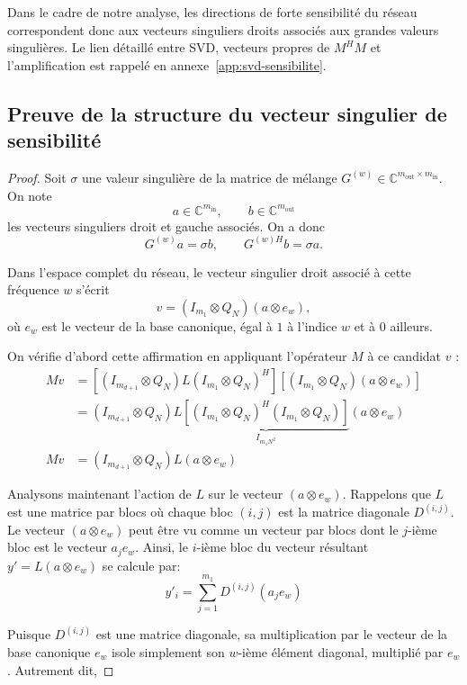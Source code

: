 Dans le cadre de notre analyse, les directions de forte sensibilité du réseau correspondent donc aux
vecteurs singuliers droits associés aux grandes valeurs singulières. Le lien détaillé entre SVD,
vecteurs propres de $M^H M$ et l'amplification est rappelé en annexe~\ref{app:svd-sensibilite}.

\subsection{Preuve de la structure du vecteur singulier de sensibilité}

\begin{proof}

Soit $\sigma$ une valeur singulière de la matrice de mélange
$G^{(w)}\in\mathbb{C}^{m_{\mathrm{out}}\times m_{\mathrm{in}}}$.
On note
\[
    a\in\mathbb{C}^{m_{\mathrm{in}}},
    \qquad
    b\in\mathbb{C}^{m_{\mathrm{out}}}
\]
les vecteurs singuliers droit et gauche associés. On a donc
\[
    G^{(w)}a=\sigma b,
    \qquad
    G^{(w)H}b=\sigma a.
\]

Dans l'espace complet du réseau, le vecteur singulier droit associé à cette fréquence $w$ s'écrit
\[
    v = (I_{m_1} \otimes Q_N) (a \otimes e_w),
\]
où $e_w$ est le vecteur de la base canonique, égal à $1$ à l'indice $w$ et à $0$ ailleurs.

On vérifie d'abord cette affirmation en appliquant l'opérateur $M$ à ce candidat $v$ :
\begin{align*}
M v &= \left[ (I_{m_{d+1}} \otimes Q_N) L (I_{m_1} \otimes Q_N)^H \right] \left[ (I_{m_1} \otimes Q_N) (a \otimes e_w) \right] \\
&= (I_{m_{d+1}} \otimes Q_N) L \underbrace{\left[ (I_{m_1} \otimes Q_N)^H (I_{m_1} \otimes Q_N) \right]}_{I_{m_1 N^2}} (a \otimes e_w) \\
M v &= (I_{m_{d+1}} \otimes Q_N) L (a \otimes e_w)
\end{align*}

Analysons maintenant l'action de $L$ sur le vecteur $(a \otimes e_w)$. Rappelons que $L$ est une matrice par blocs où 
chaque bloc $(i,j)$ est la matrice diagonale $D^{(i,j)}$. 
Le vecteur $(a \otimes e_w)$ peut être vu comme un vecteur par blocs dont le $j$-ième bloc est le vecteur $a_j e_w$. 
Ainsi, le $i$-ième bloc du vecteur résultant $y' = L (a \otimes e_w)$ se calcule par:
\[
y'_i = \sum_{j=1}^{m_1} D^{(i,j)} (a_j e_w)
\]

Puisque $D^{(i,j)}$ est une matrice diagonale, sa multiplication par le vecteur de la base canonique $e_w$ 
isole simplement son $w$-ième élément diagonal, multiplié par $e_w$. 
Autrement dit,


\end{proof}
